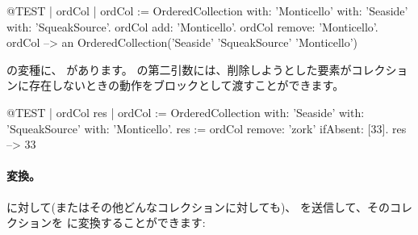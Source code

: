 \documentclass[a4paper,10pt,twoside]{book}
\begin{document}
\begin{code}{@TEST | ordCol | ordCol := OrderedCollection with: 'Monticello' with: 'Seaside' with: 'SqueakSource'.}
ordCol add: 'Monticello'.
ordCol remove: 'Monticello'.
ordCol --> an OrderedCollection('Seaside' 'SqueakSource' 'Monticello')
\end{code}

 の変種に、 があります。
の第二引数には、削除しようとした要素がコレクションに存在しないときの動作をブロックとして渡すことができます。

\begin{code}{@TEST | ordCol res | ordCol := OrderedCollection with: 'Seaside' with: 'SqueakSource' with: 'Monticello'.}
res := ordCol remove: 'zork' ifAbsent: [33].
res --> 33
\end{code}

\paragraph{変換。}
 に対して(またはその他どんなコレクションに対しても)、 を送信して、そのコレクションを  に変換することができます:




\end{document}
